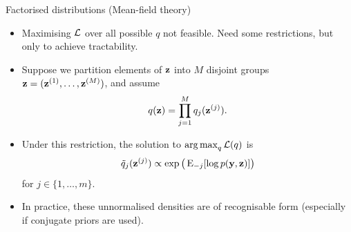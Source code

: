 %  
%
%

\begin{frame}{Factorised distributions (Mean-field theory)}
  \vspace{-20pt}
  \begin{itemize}
    \item<1-> Maximising ${\mathcal L}$ over all possible $q$ not feasible. Need some restrictions, but only to achieve tractability.
    \item<1-> Suppose we partition elements of ${\mathbf z}$ into $M$ disjoint groups ${\mathbf z} = ({\mathbf z}^{(1)}, \dots, {\mathbf z}^{(M)})$, and assume
    \[
      q({\mathbf z}) = \prod_{j=1}^M q_j({\mathbf z}^{(j)}).
    \]
    \item<2-> Under this restriction, the solution to $\operatorname*{arg\,max}_q {\mathcal L}(q)$ is
    \begin{align}\label{eq:meanfieldsoln}
      \tilde q_j({\mathbf z}^{(j)}) \propto \exp\big(\operatorname{E}_{-j}[\log p({\mathbf y},{\mathbf z})]\big)
    \end{align}
    for $j \in \{1,\dots,m\}$.
    \item<3-> In practice, these unnormalised densities are of recognisable form (especially if conjugate priors are used).
    \vspace{4pt}
  \end{itemize}
\end{frame}

